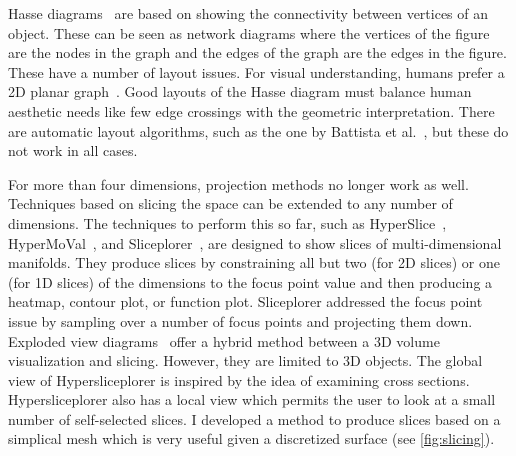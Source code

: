 Hasse diagrams~\cite{Battista:1988} are based on showing the connectivity
between vertices of an object. These can be seen as network diagrams where the
vertices of the figure are the nodes in the graph and the edges of the graph
are the edges in the figure. These have a number of layout issues.  For visual
understanding, humans prefer a 2D planar graph~\cite{Kieffer:2016}. Good layouts
of the Hasse diagram must balance human aesthetic needs like few edge crossings
with the geometric interpretation. 
There are automatic layout
algorithms, such as the one by Battista et al.~\cite{Battista:1988}, but these
do not work in all cases.

For more than four dimensions, 
projection methods no longer work as well. Techniques based on slicing the
space can be extended to any number of dimensions. The techniques to perform
this so far, such as HyperSlice~\cite{Wijk:1993},
HyperMoVal~\cite{Piringer:2010}, and Sliceplorer~\cite{Torsney-Weir:2017a},
are designed to show slices of multi-dimensional manifolds.
They produce slices by
constraining all but two (for 2D slices) or one (for 1D slices) of the
dimensions to the focus point value and then producing a heatmap, contour plot,
or function plot. Sliceplorer addressed the focus point issue by sampling over
a number of focus points and projecting them down.  Exploded view
diagrams~\cite{Karpenko:2010} offer a hybrid method between a 3D volume
visualization and slicing.  However, they 
are limited to 3D objects. 
The global view of Hypersliceplorer is inspired by the idea of examining
cross sections. Hypersliceplorer also has a local
view which permits the user to look at a small number of self-selected slices.
I developed a method to produce slices based on a simplical mesh which
is very useful given a discretized surface (see \autoref{fig:slicing}). 

